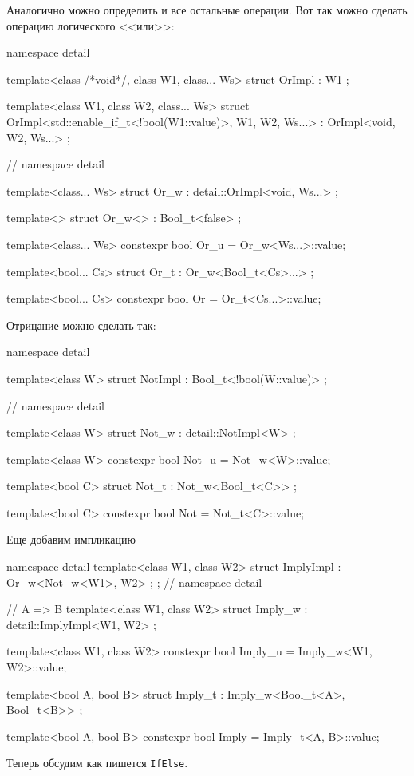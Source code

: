 Аналогично можно определить и все остальные операции.
Вот так можно сделать операцию логического <<или>>:
\begin{cppcode}
namespace detail {

template<class /*void*/, class W1, class... Ws>
struct OrImpl : W1 {};

template<class W1, class W2, class... Ws>
struct OrImpl<std::enable_if_t<!bool(W1::value)>, W1, W2, Ws...>
    : OrImpl<void, W2, Ws...> {};
} // namespace detail

template<class... Ws>
struct Or_w : detail::OrImpl<void, Ws...> {};

template<>
struct Or_w<> : Bool_t<false> {};

template<class... Ws>
constexpr bool Or_u = Or_w<Ws...>::value;

template<bool... Cs>
struct Or_t : Or_w<Bool_t<Cs>...> {};

template<bool... Cs>
constexpr bool Or = Or_t<Cs...>::value;
\end{cppcode}
Отрицание можно сделать так:
\begin{cppcode}
namespace detail {

template<class W>
struct NotImpl : Bool_t<!bool(W::value)> {};
} // namespace detail

template<class W>
struct Not_w : detail::NotImpl<W> {};

template<class W>
constexpr bool Not_u = Not_w<W>::value;

template<bool C>
struct Not_t : Not_w<Bool_t<C>> {};

template<bool C>
constexpr bool Not = Not_t<C>::value;
\end{cppcode}
Еще добавим импликацию
\begin{cppcode}
namespace detail {
template<class W1, class W2>
struct ImplyImpl : Or_w<Not_w<W1>, W2> {};
}; // namespace detail

// A => B
template<class W1, class W2>
struct Imply_w : detail::ImplyImpl<W1, W2> {};

template<class W1, class W2>
constexpr bool Imply_u = Imply_w<W1, W2>::value;

template<bool A, bool B>
struct Imply_t : Imply_w<Bool_t<A>, Bool_t<B>> {};

template<bool A, bool B>
constexpr bool Imply = Imply_t<A, B>::value;
\end{cppcode}
Теперь обсудим как пишется \verb"IfElse".
